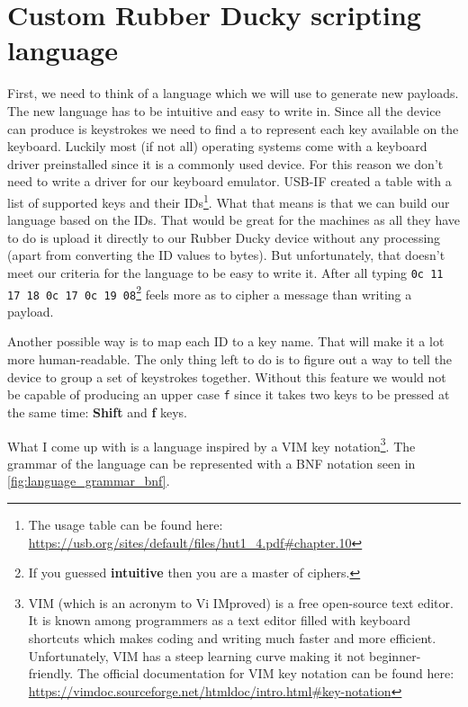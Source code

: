 \section{Custom Rubber Ducky scripting language}
First, we need to think of a language which we will use to generate new payloads. The new language has to be intuitive and easy to write in. Since all the device can produce is keystrokes we need to find a to represent each key available on the keyboard. Luckily most (if not all) operating systems come with a keyboard driver preinstalled since it is a commonly used device. For this reason we don't need to write a driver for our keyboard emulator. \mbox{USB-IF} created a table with a list of supported keys and their IDs\footnote{The usage table can be found here: \url{https://usb.org/sites/default/files/hut1_4.pdf\#chapter.10}}. What that means is that we can build our language based on the IDs. That would be great for the machines as all they have to do is upload it directly to our Rubber Ducky device without any processing (apart from converting the ID values to bytes). But unfortunately, that doesn't meet our criteria for the language to be easy to write it. After all typing \verb|0c 11 17 18 0c 17 0c 19 08|\footnote{If you guessed \textbf{intuitive} then you are a master of ciphers.} feels more as to cipher a message than writing a payload.

Another possible way is to map each ID to a key name. That will make it a lot more human-readable. The only thing left to do is to figure out a way to tell the device to group a set of keystrokes together. Without this feature we would not be capable of producing an upper case \verb|f| since it takes two keys to be pressed at the same time: \textbf{Shift} and \textbf{f} keys.

What I come up with is a language inspired by a VIM key notation\footnote{VIM (which is an acronym to Vi IMproved) is a free open-source text editor. It is known among programmers as a text editor filled with keyboard shortcuts which makes coding and writing much faster and more efficient. Unfortunately, VIM has a steep learning curve making it not beginner-friendly. The official documentation for VIM key notation can be found here: \url{https://vimdoc.sourceforge.net/htmldoc/intro.html\#key-notation}}. The grammar of the language can be represented with a BNF notation seen in \autoref{fig:language_grammar_bnf}.

